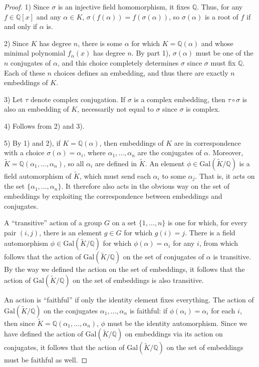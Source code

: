 \documentclass[12pt]{amsart}
\theoremstyle{definition} \newtheorem*{notation}{Notation}
\theoremstyle{remark} \newtheorem*{remark}{Remark}
\theoremstyle{remark} \newtheorem*{example}{Example}
\theoremstyle{definition} \newtheorem*{definition}{Definition}
\numberwithin{equation}{section}
\numberwithin{theorem}{section}
\begin{document}
	\begin{proof}
		1) Since $\sigma$ is an injective field homomorphism, it fixes $\mathbb{Q}$.  Thus, for any $f \in \mathbb{Q}[x]$ and any $\alpha \in K$, $\sigma(f(\alpha)) = f(\sigma(\alpha))$, so $\sigma(\alpha)$ is a root of $f$ if and only if $\alpha$ is.
		
		2) Since $K$ has degree $n$, there is some $\alpha$ for which $K = \mathbb{Q}(\alpha)$ and whose minimal polynomial $f_\alpha(x)$ has degree $n$.  By part 1), $\sigma(\alpha)$ must be one of the $n$ conjugates of $\alpha$, and this choice completely determines $\sigma$ since $\sigma$ must fix $\mathbb{Q}$.  Each of these $n$ choices defines an embedding, and thus there are exactly $n$ embeddings of $K$.
		
		3) Let $\tau$ denote complex conjugation.  If $\sigma$ is a complex embedding, then $\tau \circ \sigma$ is also an embedding of $K$, necessarily not equal to $\sigma$ since $\sigma$ is complex.
		
		4) Follows from 2) and 3).
		
		5)  By 1) and 2), if $K = \mathbb{Q}(\alpha)$, then embeddings of $K$ are in correspondence with a choice $\sigma(\alpha) = \alpha_i$, where $\alpha_1,\dots,\alpha_n$ are the conjugates of $\alpha$.  Moreover, $\widetilde{K}=\mathbb{Q}(\alpha_1,\dots,\alpha_n)$, so all $\alpha_i$ are defined in $\widetilde{K}$.  An element $\phi \in \mathrm{Gal}(\widetilde{K}/\mathbb{Q})$ is a field automorphism of $\widetilde{K}$, which must send each $\alpha_i$ to some $\alpha_j$.  That is, it acts on the set $\{\alpha_1,\dots,\alpha_n\}$.  It therefore also acts in the obvious way on the set of embeddings by exploiting the correspondence between embeddings and conjugates.  
		
		A ``transitive'' action of a group $G$ on a set $\{1,\dots,n\}$ is one for which, for every pair $(i,j)$, there is an element $g \in G$ for which $g(i)=j$.  There is a field automorphism $\phi \in \mathrm{Gal}(\widetilde{K}/\mathbb{Q})$ for which $\phi(\alpha) = \alpha_i$ for any $i$, from which follows that the action of $\mathrm{Gal}(\widetilde{K}/\mathbb{Q})$ on the set of conjugates of $\alpha$ is transitive.  By the way we defined the action on the set of embeddings, it follows that the action of $\mathrm{Gal}(\widetilde{K}/\mathbb{Q})$ on the set of embeddings is also transitive.
		
		An action is ``faithful'' if only the identity element fixes everything.  The action of $\mathrm{Gal}(\widetilde{K}/\mathbb{Q})$ on the conjugates $\alpha_1,\dots,\alpha_n$ is faithful: if $\phi(\alpha_i) = \alpha_i$ for each $i$, then since $\widetilde{K}=\mathbb{Q}(\alpha_1,\dots,\alpha_n)$, $\phi$ must be the identity automorphism.  Since we have defined the action of $\mathrm{Gal}(\widetilde{K}/\mathbb{Q})$ on embeddings via its action on conjugates, it follows that the action of $\mathrm{Gal}(\widetilde{K}/\mathbb{Q})$ on the set of embeddings must be faithful as well.
	\end{proof}
	
\end{document}
